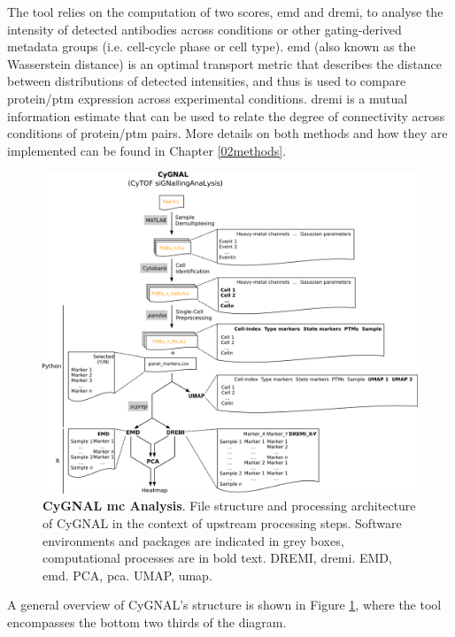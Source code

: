 The tool relies on the computation of two scores, \acrfull{emd} and \acrfull{dremi}, to analyse the intensity of detected antibodies across conditions or other gating-derived metadata groups (i.e. cell-cycle phase or cell type). \acrshort{emd} (also known as the Wasserstein distance) is an optimal transport metric that describes the distance between distributions of detected intensities, and thus is used to compare protein/\acrshort{ptm} expression across experimental conditions. \acrshort{dremi} is a mutual information estimate that can be used to relate the degree of connectivity across conditions of protein/\acrshort{ptm} pairs. More details on both methods and how they are implemented can be found in Chapter \ref{02methods}.

\begin{figure}
    \centering
    \includegraphics{03cytof/figs/3CYGNAL_pipeline.png}
    \caption{\textbf{CyGNAL \acrshort{mc} Analysis}. File structure and processing architecture of CyGNAL in the context of upstream processing steps. Software environments and packages are indicated in grey boxes, computational processes are in bold text. DREMI, \acrlong{dremi}. EMD, \acrlong{emd}. PCA, \acrlong{pca}. UMAP, \acrlong{umap}.}
    \label{fig:3cygpipe}
\end{figure}

A general overview of CyGNAL's structure is shown in Figure \ref{fig:3cygpipe}, where the tool encompasses the bottom two thirds of the diagram.

